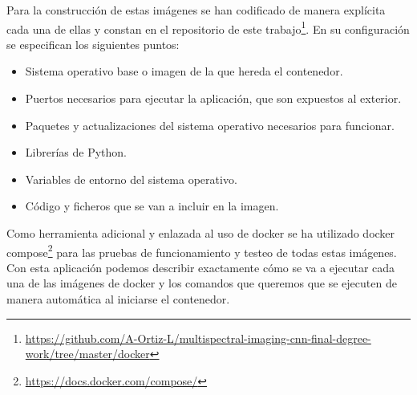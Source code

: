 Para la construcción de estas imágenes se han codificado de manera explícita cada una de ellas y constan en el repositorio de este trabajo\footnote{\url{https://github.com/A-Ortiz-L/multispectral-imaging-cnn-final-degree-work/tree/master/docker}}. En su configuración se especifican los siguientes puntos:
\begin{itemize}
    \item Sistema operativo base o imagen de la que hereda el contenedor.
    \item Puertos necesarios para ejecutar la aplicación, que son expuestos al exterior.
    \item Paquetes y actualizaciones del sistema operativo necesarios para funcionar.
    \item Librerías de Python.
    \item Variables de entorno del sistema operativo.
    \item Código y ficheros que se van a incluir en la imagen.
\end{itemize}

Como herramienta adicional y enlazada al uso de docker se ha utilizado docker compose\footnote{\url{https://docs.docker.com/compose/}} para las pruebas de funcionamiento y testeo de todas estas imágenes.
Con esta aplicación podemos describir exactamente cómo se va a ejecutar cada una de las imágenes de docker y los comandos que queremos que se ejecuten de manera automática al iniciarse el contenedor.